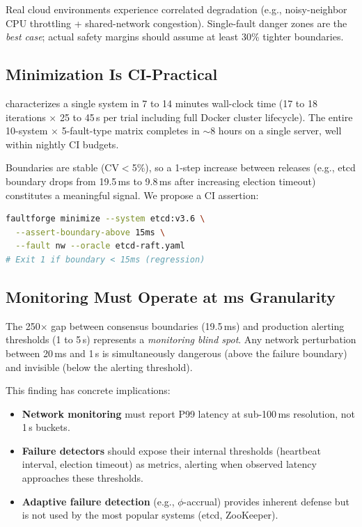  Real cloud environments experience
correlated degradation (e.g., noisy-neighbor CPU throttling + shared-network
congestion). Single-fault danger zones are the \emph{best case}; actual
safety margins should assume at least 30\% tighter boundaries.

\subsection{Minimization Is CI-Practical}
\label{sec:finding-ci}

\system{} characterizes a single system in 7 to 14 minutes wall-clock time
(17 to 18 iterations $\times$ 25 to 45\,s per trial including full Docker cluster
lifecycle). The entire 10-system $\times$ 5-fault-type matrix completes in
$\sim$8 hours on a single server, well within nightly CI budgets.

 Boundaries are stable (CV$<$5\%), so a 1-step
increase between releases (e.g., etcd boundary drops from 19.5\,ms to 9.8\,ms
after increasing election timeout) constitutes a meaningful signal. We
propose a CI assertion:

\begin{lstlisting}[language=bash,basicstyle=\ttfamily\small]
faultforge minimize --system etcd:v3.6 \
  --assert-boundary-above 15ms \
  --fault nw --oracle etcd-raft.yaml
# Exit 1 if boundary < 15ms (regression)
\end{lstlisting}

\subsection{Monitoring Must Operate at ms Granularity}
\label{sec:finding-monitoring}

The 250$\times$ gap between consensus boundaries (19.5\,ms) and production
alerting thresholds (1 to 5\,s) represents a \emph{monitoring blind spot}. Any
network perturbation between 20\,ms and 1\,s is simultaneously dangerous
(above the failure boundary) and invisible (below the alerting threshold).

This finding has concrete implications:
\begin{itemize}[leftmargin=*,topsep=2pt,itemsep=1pt]
  \item \textbf{Network monitoring} must report P99 latency at sub-100\,ms
        resolution, not 1\,s buckets.
  \item \textbf{Failure detectors} should expose their internal thresholds
        (heartbeat interval, election timeout) as metrics, alerting when
        observed latency approaches these thresholds.
  \item \textbf{Adaptive failure detection} (e.g., $\phi$-accrual) provides
        inherent defense but is not used by the most popular systems (etcd,
        ZooKeeper).
\end{itemize}


